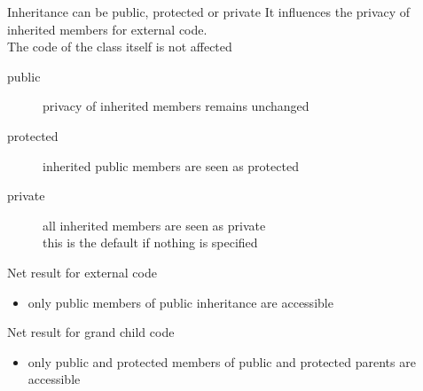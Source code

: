 \begin{frame}[fragile]
  \begin{block}{Inheritance can be public, protected or private}
    It influences the privacy of inherited members for external code.\\
    The code of the class itself is not affected
    \begin{description}
    \item[public] privacy of inherited members remains unchanged
    \item[protected] inherited public members are seen as protected
    \item[private] all inherited members are seen as private \\
      this is the default if nothing is specified
    \end{description}
  \end{block}
  \pause
  \begin{block}{Net result for external code}
    \begin{itemize}
    \item only public members of public inheritance are accessible
    \end{itemize}
  \end{block}
  \begin{block}{Net result for grand child code}
    \begin{itemize}
    \item only public and protected members of public and protected parents are accessible
    \end{itemize}
  \end{block}
\end{frame}

